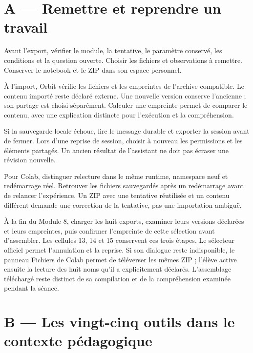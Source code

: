 \documentclass[
  canadien,
  11pt,
  a4paper,
]{report}
\begin{document}
\section{A --- Remettre et reprendre un
travail}\label{a-remettre-et-reprendre-un-travail}

Avant l'export, vérifier le module, la tentative, le paramètre conservé,
les conditions et la question ouverte. Choisir les fichiers et
observations à remettre. Conserver le notebook et le ZIP dans son espace
personnel.

À l'import, Orbit vérifie les fichiers et les empreintes de l'archive
compatible. Le contenu importé reste déclaré externe. Une nouvelle
version conserve l'ancienne ; son partage est choisi séparément.
Calculer une empreinte permet de comparer le contenu, avec une
explication distincte pour l'exécution et la compréhension.

Si la sauvegarde locale échoue, lire le message durable et exporter la
session avant de fermer. Lors d'une reprise de session, choisir à
nouveau les permissions et les éléments partagés. Un ancien résultat de
l'assistant ne doit pas écraser une révision nouvelle.

Pour Colab, distinguer relecture dans le même runtime, namespace neuf et
redémarrage réel. Retrouver les fichiers sauvegardés après un
redémarrage avant de relancer l'expérience. Un ZIP avec une tentative
réutilisée et un contenu différent demande une correction de la
tentative, pas une importation ambiguë.

À la fin du Module 8, charger les huit exports, examiner leurs versions
déclarées et leurs empreintes, puis confirmer l'empreinte de cette
sélection avant d'assembler. Les cellules 13, 14 et 15 conservent ces
trois étapes. Le sélecteur officiel permet l'annulation et la reprise.
Si son dialogue reste indisponible, le panneau Fichiers de Colab permet
de téléverser les mêmes ZIP ; l'élève active ensuite la lecture des huit
noms qu'il a explicitement déclarés. L'assemblage téléchargé reste
distinct de sa compilation et de la compréhension examinée pendant la
séance.

\section{B --- Les vingt-cinq outils dans le contexte
pédagogique}\label{b-les-vingt-cinq-outils-dans-le-contexte-puxe9dagogique}
\end{document}
